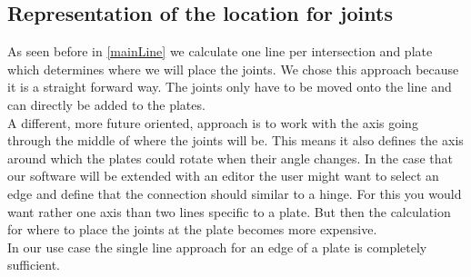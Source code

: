 \documentclass[../ClassicThesis.tex]{subfiles}
\begin{document}
\subsection{Representation of the location for joints}
As seen before in \ref{mainLine} we calculate one line per intersection and plate which determines where we will place the joints. We chose this approach because it is a straight forward way. The joints only have to be moved onto the line and can directly be added to the plates. \\
A different, more future oriented, approach is to work with the axis going through the middle of where the joints will be. This means it also defines the axis around which the plates could rotate when their angle changes. 
In the case that our software will be extended with an editor the user might want to select an edge and define that the connection should similar to a hinge. For this you would want rather one axis than two lines specific to a plate. But then the calculation for where to place the joints at the plate becomes more expensive.\\
In our use case the single line approach for an edge of a plate is completely sufficient.
\end{document}
